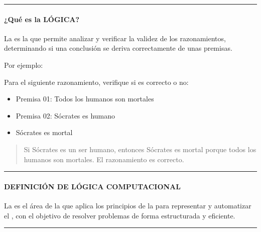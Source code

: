 \documentclass[letterpaper,10pt,spanish]{sphinxmanual}
\begin{document}
\bigskip\hrule\bigskip



\paragraph{¿Qué es la LÓGICA?}
\label{\detokenize{cursos/logica8/recursos/T01:que-es-la-logica}}
\sphinxAtStartPar
\sphinxfootnotemark[3] La  es la  que permite analizar y verificar la validez de los razonamientos, determinando si una conclusión se deriva correctamente de unas premisas.

\sphinxAtStartPar
Por ejemplo:

\sphinxAtStartPar
Para el siguiente razonamiento, verifique si es correcto o no:
\begin{itemize}
\item {} 
\sphinxAtStartPar
Premisa 01: Todos los humanos son mortales

\item {} 
\sphinxAtStartPar
Premisa 02: Sócrates es humano

\item {} 
\sphinxAtStartPar
{} Sócrates es mortal

\end{itemize}
\begin{quote}

\sphinxAtStartPar
{} Si Sócrates es un ser humano, entonces Sócrates es mortal porque todos los humanos son mortales. El razonamiento es correcto.
\end{quote}


\bigskip\hrule\bigskip



\paragraph{DEFINICIÓN DE LÓGICA COMPUTACIONAL}
\label{\detokenize{cursos/logica8/recursos/T01:definicion-de-logica-computacional}}
\sphinxAtStartPar
\sphinxfootnotemark[3] La  es el área de la  que aplica los principios de la  para representar y automatizar el , con el objetivo de resolver problemas de forma estructurada y eficiente.


\bigskip\hrule\bigskip


\sphinxstepscope
\end{document}
